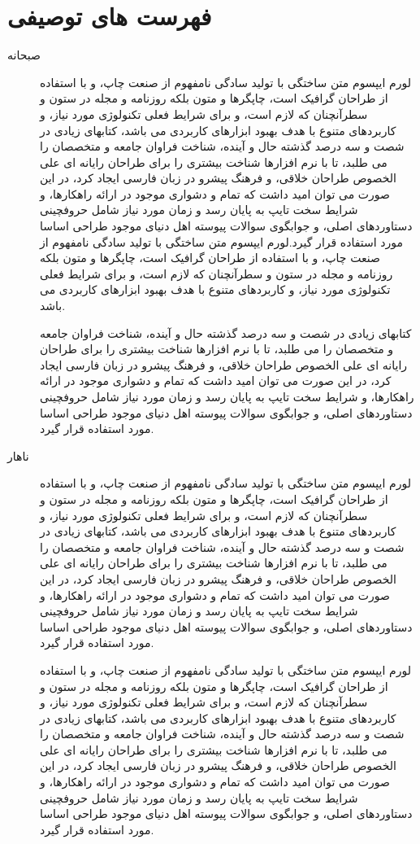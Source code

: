\documentclass[12pt]{book}
\begin{document}
\section{فهرست های توصیفی}
\begin{description}
\item[صبحانه] 
لورم ایپسوم متن ساختگی با تولید سادگی نامفهوم از صنعت چاپ، و با استفاده از طراحان گرافیک است، چاپگرها و متون بلکه روزنامه و مجله در ستون و سطرآنچنان که لازم است، و برای شرایط فعلی تکنولوژی مورد نیاز، و کاربردهای متنوع با هدف بهبود ابزارهای کاربردی می باشد، کتابهای زیادی در شصت و سه درصد گذشته حال و آینده، شناخت فراوان جامعه و متخصصان را می طلبد، تا با نرم افزارها شناخت بیشتری را برای طراحان رایانه ای علی الخصوص طراحان خلاقی، و فرهنگ پیشرو در زبان فارسی ایجاد کرد، در این صورت می توان امید داشت که تمام و دشواری موجود در ارائه راهکارها، و شرایط سخت تایپ به پایان رسد و زمان مورد نیاز شامل حروفچینی دستاوردهای اصلی، و جوابگوی سوالات پیوسته اهل دنیای موجود طراحی اساسا مورد استفاده قرار گیرد.لورم ایپسوم متن ساختگی با تولید سادگی نامفهوم از صنعت چاپ، و با استفاده از طراحان گرافیک است، چاپگرها و متون بلکه روزنامه و مجله در ستون و سطرآنچنان که لازم است، و برای شرایط فعلی تکنولوژی مورد نیاز، و کاربردهای متنوع با هدف بهبود ابزارهای کاربردی می باشد.

کتابهای زیادی در شصت و سه درصد گذشته حال و آینده، شناخت فراوان جامعه و متخصصان را می طلبد، تا با نرم افزارها شناخت بیشتری را برای طراحان رایانه ای علی الخصوص طراحان خلاقی، و فرهنگ پیشرو در زبان فارسی ایجاد کرد، در این صورت می توان امید داشت که تمام و دشواری موجود در ارائه راهکارها، و شرایط سخت تایپ به پایان رسد و زمان مورد نیاز شامل حروفچینی دستاوردهای اصلی، و جوابگوی سوالات پیوسته اهل دنیای موجود طراحی اساسا مورد استفاده قرار گیرد.

\item[ناهار] 
لورم ایپسوم متن ساختگی با تولید سادگی نامفهوم از صنعت چاپ، و با استفاده از طراحان گرافیک است، چاپگرها و متون بلکه روزنامه و مجله در ستون و سطرآنچنان که لازم است، و برای شرایط فعلی تکنولوژی مورد نیاز، و کاربردهای متنوع با هدف بهبود ابزارهای کاربردی می باشد، کتابهای زیادی در شصت و سه درصد گذشته حال و آینده، شناخت فراوان جامعه و متخصصان را می طلبد، تا با نرم افزارها شناخت بیشتری را برای طراحان رایانه ای علی الخصوص طراحان خلاقی، و فرهنگ پیشرو در زبان فارسی ایجاد کرد، در این صورت می توان امید داشت که تمام و دشواری موجود در ارائه راهکارها، و شرایط سخت تایپ به پایان رسد و زمان مورد نیاز شامل حروفچینی دستاوردهای اصلی، و جوابگوی سوالات پیوسته اهل دنیای موجود طراحی اساسا مورد استفاده قرار گیرد.

لورم ایپسوم متن ساختگی با تولید سادگی نامفهوم از صنعت چاپ، و با استفاده از طراحان گرافیک است، چاپگرها و متون بلکه روزنامه و مجله در ستون و سطرآنچنان که لازم است، و برای شرایط فعلی تکنولوژی مورد نیاز، و کاربردهای متنوع با هدف بهبود ابزارهای کاربردی می باشد، کتابهای زیادی در شصت و سه درصد گذشته حال و آینده، شناخت فراوان جامعه و متخصصان را می طلبد، تا با نرم افزارها شناخت بیشتری را برای طراحان رایانه ای علی الخصوص طراحان خلاقی، و فرهنگ پیشرو در زبان فارسی ایجاد کرد، در این صورت می توان امید داشت که تمام و دشواری موجود در ارائه راهکارها، و شرایط سخت تایپ به پایان رسد و زمان مورد نیاز شامل حروفچینی دستاوردهای اصلی، و جوابگوی سوالات پیوسته اهل دنیای موجود طراحی اساسا مورد استفاده قرار گیرد.
\end{description}
\end{document}
